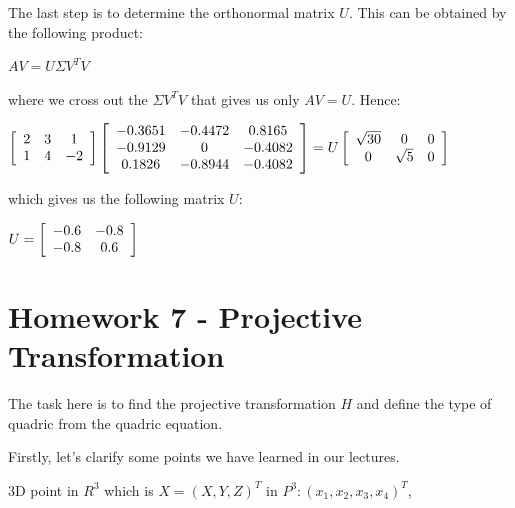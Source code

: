 \documentclass[]{article}
\begin{document}
\vspace{0.5em}

The last step is to determine the orthonormal matrix $U$. This can be obtained by the following product:

\vspace{0.5em}

\centerline {
	$AV = U \Sigma V^TV$
} 

\vspace{0.5em}

where we cross out the $\Sigma V^TV$ that gives us only $AV = U$. Hence:

\vspace{0.5em}

\centerline{ $\left[ {\begin{array}{*{20}c}
		2 & 3 & 1 \\
		1 & 4 & -2   
		\end{array} } \right] 
			\left[ {\begin{array}{*{20}c}
		-0.3651 & -0.4472 & 0.8165 \\
		-0.9129 & 0 & -0.4082 \\ 
		0.1826 & -0.8944 & -0.4082  
		\end{array} } \right] = U \left[ {\begin{array}{*{20}c}
		\sqrt{30} & 0 & 0 \\
		0 & \sqrt{5} & 0   
		\end{array} } \right]$ 
}

\vspace{0.5em}

which gives us the following matrix $U$:

\vspace{0.5em}
\centerline {
	$U = \left[ {\begin{array}{*{20}c}
		-0.6 & -0.8 \\
		-0.8 & 0.6   
		\end{array} } \right]$
}

\section{Homework 7 - Projective Transformation}  
The task here is to find the projective transformation $H$ and define the type of quadric from the quadric equation.

Firstly, let's clarify some points we have learned in our lectures. 

\centerline {
	3D point in $R^3$ which is $X = (X, Y, Z)^T$ in $P^3 : (x_1, x_2, x_3, x_4)^T$,
}
\end{document}
